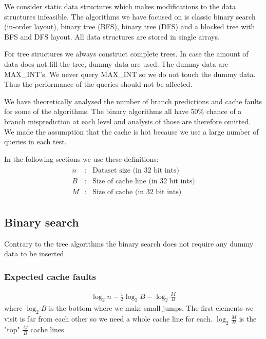 We consider static data structures which makes modifications to the data structures infeasible.
The algorithms we have focused on is classic binary search (in-order layout), binary tree (BFS), binary tree (DFS) and a blocked tree with BFS and DFS layout. All data structures are stored in single arrays.

For tree structures we always construct complete trees. In case the amount of data does not fill the tree, dummy data are used. The dummy data are MAX\_INT's. We never query MAX\_INT so we do not touch the dummy data. Thus the performance of the queries should not be affected.

We have theoretically analysed the number of branch predictions and cache faults for some of the algorithms. The binary algorithms all have 50\% chance of a branch misprediction at each level and analysis of those are therefore omitted. We made the assumption that the cache is hot because we use a large number of queries in each test.

In the following sections we use these definitions:
\begin{eqnarray*}
\begin{array}{rcl}
n & : & \textrm{Dataset size (in 32 bit ints)} \\
B & : & \textrm{Size of cache line (in 32 bit ints)} \\
M & : & \textrm{Size of cache (in 32 bit ints)}
\end{array}
\end{eqnarray*}

\subsection{Binary search}

Contrary to the tree algorithms the binary search does not require any dummy data to be inserted.

\subsubsection*{Expected cache faults}

\begin{eqnarray*}
\log_2 n - \frac{1}{2}\log_2 B - \log_2 \frac{M}{B} 
\end{eqnarray*}
where $\log_2 B$ is the bottom where we make small jumps. The first elements we visit is far from each other so we need a whole cache line for each. $\log_2 \frac{M}{B}$ is the "top" $\frac{M}{B}$ cache lines.

